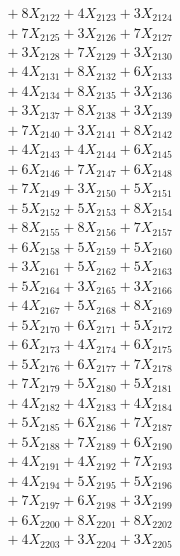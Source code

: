 \documentclass[a4paper,10pt]{article}
\begin{document}
{\begin{align}
&\;  + 8 X_{2122} + 4 X_{2123} + 3 X_{2124} \\[0.3ex]
&\;  + 7 X_{2125} + 3 X_{2126} + 7 X_{2127} \\[0.3ex]
&\;  + 3 X_{2128} + 7 X_{2129} + 3 X_{2130} \\[0.3ex]
&\;  + 4 X_{2131} + 8 X_{2132} + 6 X_{2133} \\[0.3ex]
&\;  + 4 X_{2134} + 8 X_{2135} + 3 X_{2136} \\[0.3ex]
&\;  + 3 X_{2137} + 8 X_{2138} + 3 X_{2139} \\[0.5ex]\allowbreak
&\;  + 7 X_{2140} + 3 X_{2141} + 8 X_{2142} \\[0.3ex]
&\;  + 4 X_{2143} + 4 X_{2144} + 6 X_{2145} \\[0.3ex]
&\;  + 6 X_{2146} + 7 X_{2147} + 6 X_{2148} \\[0.3ex]
&\;  + 7 X_{2149} + 3 X_{2150} + 5 X_{2151} \\[0.3ex]
&\;  + 5 X_{2152} + 5 X_{2153} + 8 X_{2154} \\[0.3ex]
&\;  + 8 X_{2155} + 8 X_{2156} + 7 X_{2157} \\[0.3ex]
&\;  + 6 X_{2158} + 5 X_{2159} + 5 X_{2160} \\[0.3ex]
&\;  + 3 X_{2161} + 5 X_{2162} + 5 X_{2163} \\[0.3ex]
&\;  + 5 X_{2164} + 3 X_{2165} + 3 X_{2166} \\[0.3ex]
&\;  + 4 X_{2167} + 5 X_{2168} + 8 X_{2169} \\[0.5ex]\allowbreak
&\;  + 5 X_{2170} + 6 X_{2171} + 5 X_{2172} \\[0.3ex]
&\;  + 6 X_{2173} + 4 X_{2174} + 6 X_{2175} \\[0.3ex]
&\;  + 5 X_{2176} + 6 X_{2177} + 7 X_{2178} \\[0.3ex]
&\;  + 7 X_{2179} + 5 X_{2180} + 5 X_{2181} \\[0.3ex]
&\;  + 4 X_{2182} + 4 X_{2183} + 4 X_{2184} \\[0.3ex]
&\;  + 5 X_{2185} + 6 X_{2186} + 7 X_{2187} \\[0.3ex]
&\;  + 5 X_{2188} + 7 X_{2189} + 6 X_{2190} \\[0.3ex]
&\;  + 4 X_{2191} + 4 X_{2192} + 7 X_{2193} \\[0.3ex]
&\;  + 4 X_{2194} + 5 X_{2195} + 5 X_{2196} \\[0.3ex]
&\;  + 7 X_{2197} + 6 X_{2198} + 3 X_{2199} \\[0.5ex]\allowbreak
&\;  + 6 X_{2200} + 8 X_{2201} + 8 X_{2202} \\[0.3ex]
&\;  + 4 X_{2203} + 3 X_{2204} + 3 X_{2205} \\[0.3ex]

\end{align}}
\end{document}
